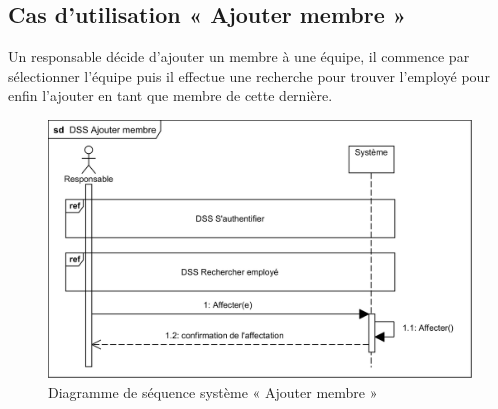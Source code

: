     \subsection{Cas d'utilisation « Ajouter membre »}
    Un responsable décide d’ajouter un membre à une équipe, il commence par sélectionner l’équipe puis il effectue une recherche pour trouver l’employé pour enfin l’ajouter en tant que membre de cette dernière.  
        \begin{figure}[h!]
             \centering
            \includegraphics[scale=1]{images/DSS/DSS Ajouter membre.png}
             \caption{Diagramme de séquence système « Ajouter membre »}
             \label{fig4}
        \end{figure}
        

    
